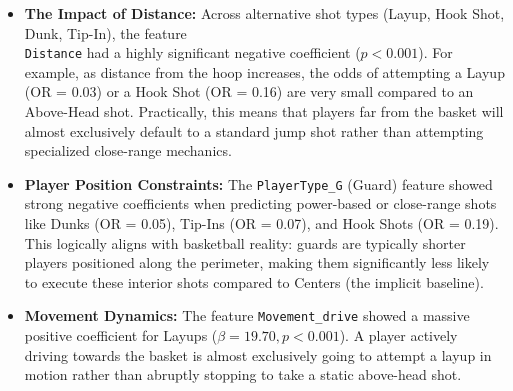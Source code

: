 \documentclass[fleqn,moreauthors,10pt]{ds_report}
\begin{document}
\begin{table}[h!]
    \centering
    \caption{Significant Features (vs. Above Head)}
    \vspace{0.1cm}
    \vspace{0.2cm}
\end{table}

\begin{itemize}
    \item \textbf{The Impact of Distance:} Across alternative shot types (Layup, Hook Shot, Dunk, Tip-In), the feature 
    \\    
    \texttt{Distance} had a highly significant negative coefficient ($p < 0.001$). For example, as distance from the hoop increases, the odds of attempting a Layup (OR = 0.03) or a Hook Shot (OR = 0.16) are very small compared to an Above-Head shot. Practically, this means that players far from the basket will almost exclusively default to a standard jump shot rather than attempting specialized close-range mechanics.
    \item \textbf{Player Position Constraints:} The \texttt{PlayerType\_G} (Guard) feature showed strong negative coefficients when predicting power-based or close-range shots like Dunks (OR = 0.05), Tip-Ins (OR = 0.07), and Hook Shots (OR = 0.19). This logically aligns with basketball reality: guards are typically shorter players positioned along the perimeter, making them significantly less likely to execute these interior shots compared to Centers (the implicit baseline).
    \item \textbf{Movement Dynamics:} The feature \texttt{Movement\_drive} showed a massive positive coefficient for Layups ($\beta = 19.70, p < 0.001$). A player actively driving towards the basket is almost exclusively going to attempt a layup in motion rather than abruptly stopping to take a static above-head shot.
\end{itemize}
\end{document}
